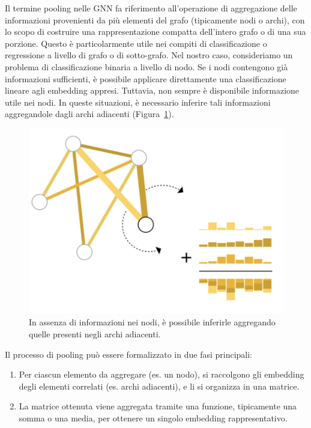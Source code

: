 Il termine pooling nelle GNN fa riferimento all’operazione di aggregazione delle informazioni provenienti da più elementi del grafo (tipicamente nodi o archi), con lo scopo di costruire una rappresentazione compatta dell’intero grafo o di una sua porzione. Questo è particolarmente utile nei compiti di classificazione o regressione a livello di grafo o di sotto-grafo. Nel nostro caso, consideriamo un problema di classificazione binaria a livello di nodo. Se i nodi contengono già informazioni sufficienti, è possibile applicare direttamente una classificazione lineare agli embedding appresi. Tuttavia, non sempre è disponibile informazione utile nei nodi. In queste situazioni, è necessario inferire tali informazioni aggregandole dagli archi adiacenti (Figura~\ref{fig:aggEdg}).
\begin{figure}
    \centering
    \includegraphics[width=\textwidth]{figure/AggEdges.png}
    \caption{In assenza di informazioni nei nodi, è possibile inferirle aggregando quelle presenti negli archi adiacenti.}
    \label{fig:aggEdg}
\end{figure}
Il processo di pooling può essere formalizzato in due fasi principali:

\begin{enumerate}
    \item Per ciascun elemento da aggregare (es. un nodo), si raccolgono gli embedding degli elementi correlati (es. archi adiacenti), e li si organizza in una matrice.
    \item La matrice ottenuta viene aggregata tramite una funzione, tipicamente una somma o una media, per ottenere un singolo embedding rappresentativo.
\end{enumerate}

